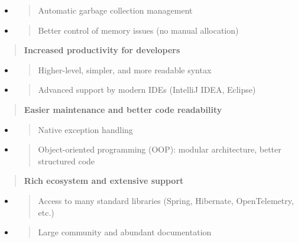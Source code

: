 \documentclass[12pt,a4paper]{report}
\begin{document}
\begin{itemize}
\item
  \begin{quote}
  Automatic garbage collection management
  \end{quote}
\item
  \begin{quote}
  Better control of memory issues (no manual allocation)
  \end{quote}
\end{itemize}

\begin{quote}
\textbf{Increased productivity for developers}
\end{quote}

\begin{itemize}
\item
  \begin{quote}
  Higher-level, simpler, and more readable syntax
  \end{quote}
\item
  \begin{quote}
  Advanced support by modern IDEs (IntelliJ IDEA, Eclipse)
  \end{quote}
\end{itemize}

\begin{quote}
\textbf{Easier maintenance and better code readability}
\end{quote}

\begin{itemize}
\item
  \begin{quote}
  Native exception handling
  \end{quote}
\item
  \begin{quote}
  Object-oriented programming (OOP): modular architecture, better
  structured code
  \end{quote}
\end{itemize}

\begin{quote}
\textbf{Rich ecosystem and extensive support}
\end{quote}

\begin{itemize}
\item
  \begin{quote}
  Access to many standard libraries (Spring, Hibernate, OpenTelemetry,
  etc.)
  \end{quote}
\item
  \begin{quote}
  Large community and abundant documentation
  \end{quote}
\end{itemize}
\end{document}

